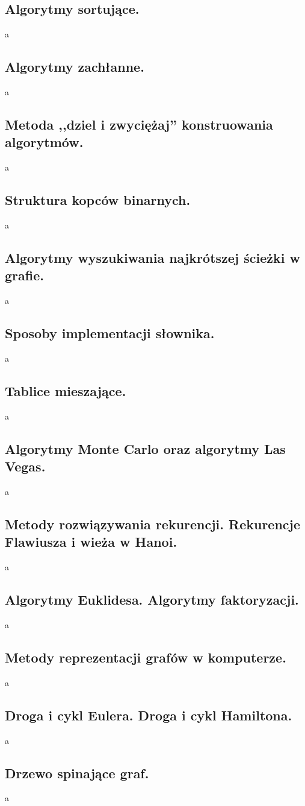 \documentclass[a4paper,12pt,oneside]{book}
\begin{document}
			\subsection{\color{red}Algorytmy sortujące.}
				a
			\newpage\subsection{\color{red}Algorytmy zachłanne.}
				a
			\newpage\subsection{\color{red}Metoda ,,dziel i zwyciężaj'' konstruowania algorytmów.}
				a
			\newpage\subsection{\color{red}Struktura kopców binarnych.}
				a
			\newpage\subsection{\color{red}Algorytmy wyszukiwania najkrótszej ścieżki w grafie.}
				a
			\newpage\subsection{\color{red}Sposoby implementacji słownika.}
				a
			\newpage\subsection{\color{red}Tablice mieszające.}
				a
			\newpage\subsection{\color{red}Algorytmy Monte Carlo oraz algorytmy Las Vegas.}
				a
			\newpage\subsection{\color{red}Metody rozwiązywania rekurencji. Rekurencje Flawiusza i wieża w Hanoi.}
				a
			\newpage\subsection{\color{red}Algorytmy Euklidesa. Algorytmy faktoryzacji.}
				a
			\newpage\subsection{\color{red}Metody reprezentacji grafów w komputerze.}
				a
			\newpage\subsection{\color{red}Droga i cykl Eulera. Droga i cykl Hamiltona.}
				a
			\newpage\subsection{\color{red}Drzewo spinające graf.}
				a
		
\end{document}
